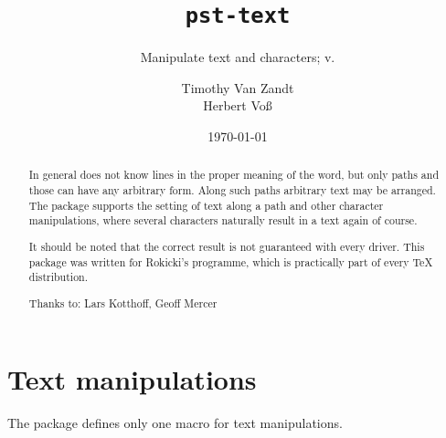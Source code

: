 \documentclass[fontsize=11pt,english,BCOR=10mm,DIV=12,bibliography=totoc,parskip=false,
   headings=small, headinclude=false,footinclude=false,oneside,abstract=on]{pst-doc}
\let\pstTextFV\fileversion
\begin{document}
\title{\texttt{pst-text}}
\subtitle{Manipulate text and characters; v.\pstTextFV}
\author{Timothy Van Zandt\\Herbert Voß}
\date{\today}
\maketitle

\tableofcontents

\clearpage%

\begin{abstract}
In general \PS does not know lines in the proper meaning of the word, but only
paths and those can have any arbitrary form. Along such paths
arbitrary text may be arranged. The package
 supports the setting of text along a path
and other character manipulations, where several characters 
naturally result in a text again of course.

It should be noted that the correct result is not guaranteed with every  driver.
This package was written for Rokicki's 
 programme, which is practically part of every \TeX{}
distribution.

\vfill
Thanks to: Lars Kotthoff, Geoff Mercer
\end{abstract}

\clearpage

\section{Text manipulations}\label{sec:psttext:Textmanipulationen}
The package  defines only one macro for text manipulations.
\begin{BDef}
\end{BDef}
\end{document}
